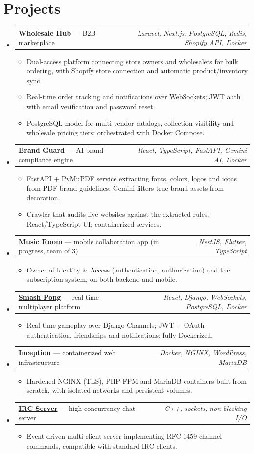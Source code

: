 \documentclass[letterpaper,10.5pt]{article}
\makeatletter
\newcommand{\project}[2]{%
  \item\begin{tabular*}{\linewidth}{l@{\extracolsep{\fill}}r}
    #1 & \small\textit{#2} \\
  \end{tabular*}\vspace{-6pt}}
\newcommand{\pt}[1]{\item\small{#1\vspace{-1.5pt}}}
\newenvironment{entries}{\begin{itemize}[leftmargin=0.12in,label={}]}{\end{itemize}}
\newenvironment{points}{\begin{itemize}[leftmargin=0.2in,itemsep=0pt,topsep=3pt,label=\textbullet]}{\end{itemize}\vspace{-3pt}}
\makeatother
\begin{document}
\section{Projects}
\begin{entries}
  \project{\textbf{Wholesale Hub} --- B2B marketplace}{Laravel, Next.js, PostgreSQL, Redis, Shopify API, Docker}
  \begin{points}
    \pt{Dual-access platform connecting store owners and wholesalers for bulk ordering, with Shopify store connection and automatic product/inventory sync.}
    \pt{Real-time order tracking and notifications over WebSockets; JWT auth with email verification and password reset.}
    \pt{PostgreSQL model for multi-vendor catalogs, collection visibility and wholesale pricing tiers; orchestrated with Docker Compose.}
  \end{points}
  \project{\textbf{Brand Guard} --- AI brand compliance engine}{React, TypeScript, FastAPI, Gemini AI, Docker}
  \begin{points}
    \pt{FastAPI + PyMuPDF service extracting fonts, colors, logos and icons from PDF brand guidelines; Gemini filters true brand assets from decoration.}
    \pt{Crawler that audits live websites against the extracted rules; React/TypeScript UI; containerized services.}
  \end{points}
  \project{\textbf{Music Room} --- mobile collaboration app (in progress, team of 3)}{NestJS, Flutter, TypeScript}
  \begin{points}
    \pt{Owner of Identity \& Access (authentication, authorization) and the subscription system, on both backend and mobile.}
  \end{points}
  \project{\textbf{\href{https://github.com/USM4/ft_transcendence}{Smash Pong}} --- real-time multiplayer platform}{React, Django, WebSockets, PostgreSQL, Docker}
  \begin{points}
    \pt{Real-time gameplay over Django Channels; JWT + OAuth authentication, friendships and notifications; fully Dockerized.}
  \end{points}
  \project{\textbf{\href{https://github.com/USM4/Inception}{Inception}} --- containerized web infrastructure}{Docker, NGINX, WordPress, MariaDB}
  \begin{points}
    \pt{Hardened NGINX (TLS), PHP-FPM and MariaDB containers built from scratch, with isolated networks and persistent volumes.}
  \end{points}
  \project{\textbf{\href{https://github.com/USM4/ft_irc}{IRC Server}} --- high-concurrency chat server}{C++, sockets, non-blocking I/O}
  \begin{points}
    \pt{Event-driven multi-client server implementing RFC 1459 channel commands, compatible with standard IRC clients.}
  \end{points}
\end{entries}
\end{document}
